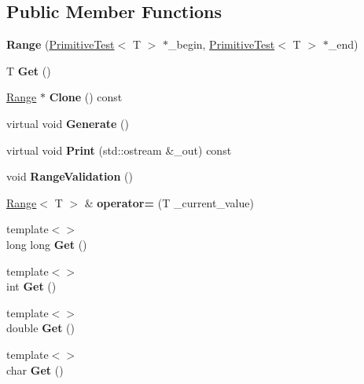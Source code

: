 \subsection*{Public Member Functions}
\begin{DoxyCompactItemize}
\item 
\mbox{\label{class_range_a32cb63626f447ec44fac820ebe16b2d1}} 
{\bfseries Range} (\hyperlink{class_primitive_test}{Primitive\+Test}$<$ T $>$ $\ast$\+\_\+begin, \hyperlink{class_primitive_test}{Primitive\+Test}$<$ T $>$ $\ast$\+\_\+end)
\item 
\mbox{\label{class_range_aadfc9764842da72211e5309484327d92}} 
T {\bfseries Get} ()
\item 
\mbox{\label{class_range_a2609e897d13111a4b1bc499c0ef08f0c}} 
\hyperlink{class_range}{Range} $\ast$ {\bfseries Clone} () const
\item 
\mbox{\label{class_range_a8c90569fec87e93b9f00ba87b60dbbdf}} 
virtual void {\bfseries Generate} ()
\item 
\mbox{\label{class_range_a00c9138fb65efccb1f8d5156e067dc47}} 
virtual void {\bfseries Print} (std\+::ostream \&\+\_\+out) const
\item 
\mbox{\label{class_range_a64badfcbc1a69b9dc4e2210dd3af3d5c}} 
void {\bfseries Range\+Validation} ()
\item 
\mbox{\label{class_range_a60733afafbde307d7f237acc51088e67}} 
\hyperlink{class_range}{Range}$<$ T $>$ \& {\bfseries operator=} (T \+\_\+current\+\_\+value)
\item 
\mbox{\label{class_range_a06b5093d33e6e7d5a6d3a7f94f744c8a}} 
{\footnotesize template$<$$>$ }\\long long {\bfseries Get} ()
\item 
\mbox{\label{class_range_a05a289b5408cb3dac5f3b4c2c487a2c3}} 
{\footnotesize template$<$$>$ }\\int {\bfseries Get} ()
\item 
\mbox{\label{class_range_a7461e74f69c79c8b96a938f0f81a33c3}} 
{\footnotesize template$<$$>$ }\\double {\bfseries Get} ()
\item 
\mbox{\label{class_range_a7bd69d54a6135d371484e1e46ad408e9}} 
{\footnotesize template$<$$>$ }\\char {\bfseries Get} ()
\end{DoxyCompactItemize}
